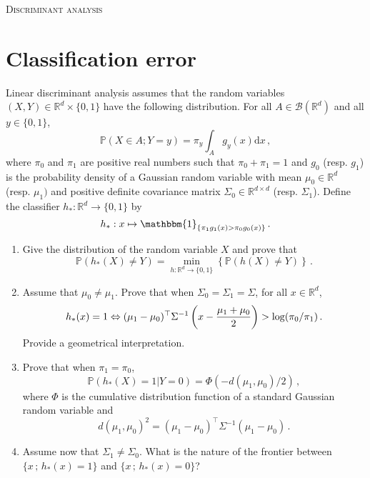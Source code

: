 \documentclass[a4paper,10pt,fleqn]{article}
\newcommand{\eqsp}{\,}
\newcommand{\rmd}{\mathrm{d}}
\newcommand{\rset}{\ensuremath{\mathbb{R}}}
\newcommand{\bP}{\mathbb{P}}
\newcommand{\1}{\ensuremath{\mathbbm{1}}}
\begin{document}

\noindent\hrulefill

\begin{center}
\textsc{Discriminant analysis}
\end{center}
\hrulefill

\section{Classification error}

Linear discriminant analysis assumes that the random variables $(X,Y)\in \rset^d\times\{0,1\}$ have the following distribution. For all $A\in \mathcal{B}(\mathbb{R}^d)$ and all $y\in\{0,1\}$,
$$
\bP\left(X\in A;Y=y\right) = \pi_y \int_A g_y(x) \rmd x\eqsp,
$$
where $\pi_{0}$ and $\pi_1$ are positive real numbers such that $\pi_0+\pi_{1}=1$ and $g_0$ (resp. $g_1$) is the probability density of a Gaussian random variable with mean $\mu_0\in\rset^d$ (resp. $\mu_1)$ and positive definite covariance matrix $\Sigma_0\in \rset^{d\times d}$ (resp. $\Sigma_1$).  Define the classifier $h_{*}:\mathbb{R}^d\to\{0,1\}$ by
$$
h_{*}:x \mapsto \1_{\{\pi_{1}g_{1}(x)>\pi_{0}g_{0}(x)\}}\eqsp.
$$
\begin{enumerate}
\item Give the distribution of the random variable $X$ and prove that 
$$
\bP(h_{*}(X)\neq Y)=\min_{h:\rset^d\to \{0,1\}}\left\{\bP(h(X)\neq Y)\right\}\eqsp.
$$
\item Assume that  $\mu_0\ne\mu_1$. Prove that when $\Sigma_0=\Sigma_1=\Sigma$, for all $x\in\rset^d$,
$$
h_{*}(x) = 1 \Leftrightarrow (\mu_{1}-\mu_{0})^\top\Sigma^{-1}\left(x-{\mu_{1}+\mu_{0}\over2}\right)>\log(\pi_{0}/\pi_{1})\eqsp.
$$
Provide a geometrical interpretation.
\item Prove that when $\pi_{1}=\pi_{0}$, 
$$
\bP(h_{*}(X)=1|Y=0)=\Phi(-d(\mu_{1},\mu_{0})/2)\eqsp,
$$
where $\Phi$ is the cumulative distribution function of a standard Gaussian random variable  and 
$$
d(\mu_{1},\mu_{0})^2=(\mu_{1}-\mu_{0})^\top\Sigma^{-1}(\mu_{1}-\mu_{0})\eqsp.
$$
\item Assume now that $\Sigma_{1}\neq \Sigma_{0}$. What is the nature of the frontier between $\{x\eqsp;\eqsp h_{*}(x)=1\}$ and $\{x\eqsp;\eqsp h_{*}(x)=0\}$?
\end{enumerate}
\end{document}
